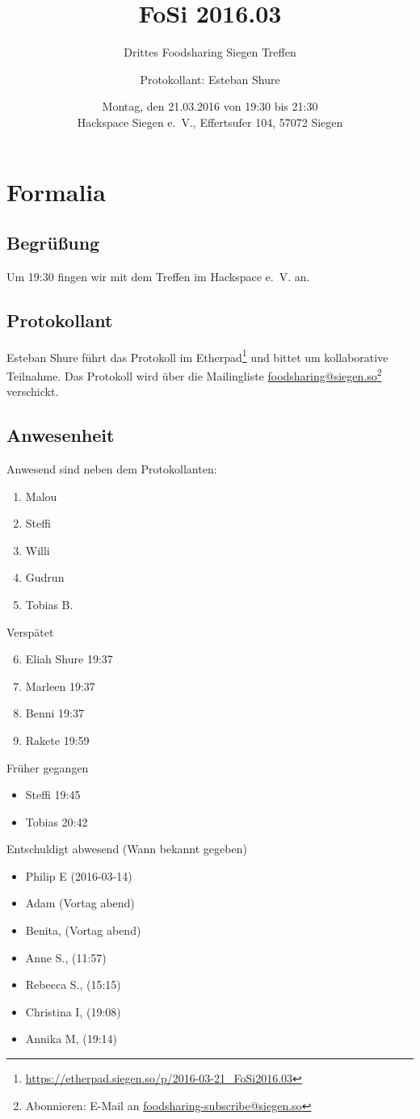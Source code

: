 \documentclass{scrreprt}
\begin{document}
\subject{Protokoll}
\title{FoSi 2016.03}
\subtitle{Drittes Foodsharing Siegen Treffen}
\author{Protokollant: Esteban Shure}
\date{Montag, den 21.03.2016 von 19:30 bis 21:30\\Hackspace Siegen e.~V., Effertsufer 104, 57072 Siegen}
\maketitle
\newpage
\tableofcontents
\newpage

\chapter{Formalia}
\section{Begrüßung}
Um 19:30 fingen wir mit dem Treffen im Hackspace e.~V. an. 
\section{Protokollant}
Esteban Shure führt das Protokoll im Etherpad\footnote{\url{https://etherpad.siegen.so/p/2016-03-21_FoSi2016.03}} und bittet um kollaborative Teilnahme. Das Protokoll wird über die Mailingliste \url{foodsharing@siegen.so}\footnote{Abonnieren: E-Mail an \url{foodsharing-subscribe@siegen.so}} verschickt.
\section{Anwesenheit}
Anwesend sind neben dem Protokollanten: 
\begin{enumerate}
	\item Malou
	\item Steffi
	\item Willi
	\item Gudrun
	\item Tobias B.
\end{enumerate}
Verspätet
\begin{enumerate}
	\setcounter{enumi}{5}
	\item Eliah Shure 19:37
	\item Marleen 19:37
	\item Benni 19:37
	\item Rakete 19:59
\end{enumerate}
Früher gegangen
\begin{itemize}
	\item Steffi 19:45
	\item Tobias 20:42
\end{itemize}
\newpage
Entschuldigt abwesend (Wann bekannt gegeben)
\begin{itemize}
	\item Philip E (2016-03-14)
    \item Adam (Vortag abend)
    \item Benita, (Vortag abend)
	\item Anne S., (11:57)
	\item Rebecca S., (15:15)
	\item Christina I, (19:08)
	\item Annika M, (19:14)
\end{itemize}
\end{document}
